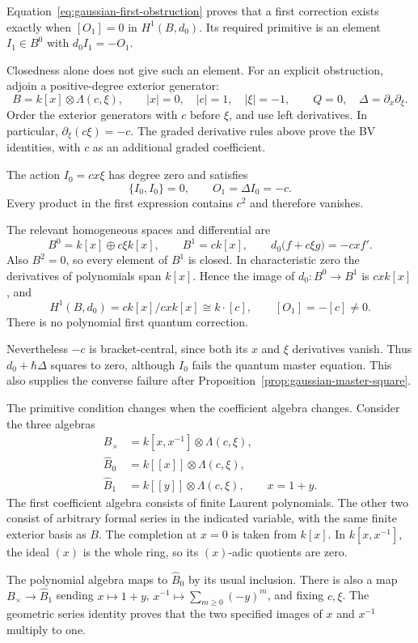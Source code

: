 Equation~\eqref{eq:gaussian-first-obstruction} proves that a first
correction exists exactly when $[O_1]=0$ in $H^1(B,d_0)$.
Its required primitive is an element $I_1\in B^0$ with
$d_0I_1=-O_1$.

Closedness alone does not give such an element.
For an explicit obstruction, adjoin a positive-degree exterior generator:
\[
 B=k[x]\otimes\Lambda(c,\xi),
 \qquad |x|=0,\quad |c|=1,\quad |\xi|=-1,
 \qquad Q=0,\quad \Delta=\partial_x\partial_\xi.
\]
Order the exterior generators with $c$ before $\xi$, and use left
derivatives. In particular, $\partial_\xi(c\xi)=-c$.
The graded derivative rules above prove the BV identities, with $c$
as an additional graded coefficient.

The action $I_0=cx\xi$ has degree zero and satisfies
\[
 \{I_0,I_0\}=0,\qquad O_1=\Delta I_0=-c.
\]
Every product in the first expression contains $c^2$ and therefore
vanishes.

The relevant homogeneous spaces and differential are
\[
 B^0=k[x]\oplus c\xi k[x],\qquad B^1=c k[x],
 \qquad
 d_0\bigl(f+c\xi g\bigr)=-cx f'.
\]
Also $B^2=0$, so every element of $B^1$ is closed.
In characteristic zero the derivatives of polynomials span $k[x]$.
Hence the image of $d_0:B^0\to B^1$ is $cx k[x]$, and
\[
 H^1(B,d_0)=c k[x]/cx k[x]\cong k\cdot[c],
 \qquad [O_1]=-[c]\ne0.
\]
There is no polynomial first quantum correction.

Nevertheless $-c$ is bracket-central, since both its $x$ and $\xi$
derivatives vanish. Thus $d_0+\hbar\Delta$ squares to zero, although
$I_0$ fails the quantum master equation.
This also supplies the converse failure after
Proposition~\ref{prop:gaussian-master-square}.

The primitive condition changes when the coefficient algebra changes.
Consider the three algebras
\[
 \begin{split}
 B_\times&=k[x,x^{-1}]\otimes\Lambda(c,\xi),\\
 \widehat B_0&=k[[x]]\otimes\Lambda(c,\xi),\\
 \widehat B_1&=k[[y]]\otimes\Lambda(c,\xi),\qquad x=1+y.
 \end{split}
\]
The first coefficient algebra consists of finite Laurent polynomials.
The other two consist of arbitrary formal series in the indicated
variable, with the same finite exterior basis as $B$.
The completion at $x=0$ is taken from $k[x]$.
In $k[x,x^{-1}]$, the ideal $(x)$ is the whole ring, so its
$(x)$-adic quotients are zero.

The polynomial algebra maps to $\widehat B_0$ by its usual inclusion.
There is also a map $B_\times\to\widehat B_1$ sending
$x\mapsto1+y$, $x^{-1}\mapsto\sum_{m\geq0}(-y)^m$, and fixing
$c,\xi$. The geometric series identity proves that the two specified
images of $x$ and $x^{-1}$ multiply to one.

